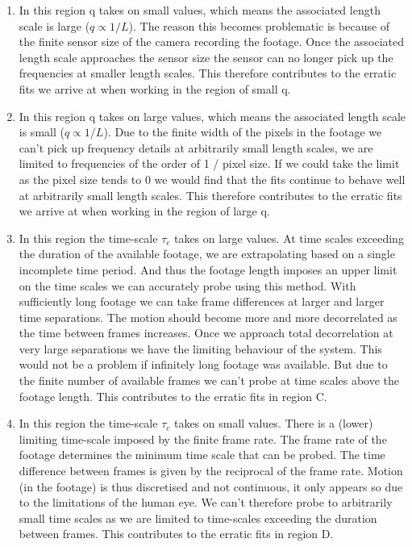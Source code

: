 \documentclass[11pt]{article}
\begin{document}
\begin{enumerate}[label=(\Alph*)]
\item In this region q takes on small values, which means the associated length scale is large ($q \propto 1 / L$). The reason this becomes problematic is because of the finite sensor size of the camera recording the footage. Once the associated length scale approaches the sensor size the sensor can no longer pick up the frequencies at smaller length scales. This therefore contributes to the erratic fits we arrive at when working in the region of small q.
     
\item In this region q takes on large values, which means the associated length scale is small ($q \propto 1 / L$). Due to the finite width of the pixels in the footage we can't pick up frequency details at arbitrarily small length scales, we are limited to frequencies of the order of 1 / pixel size. If we could take the limit as the pixel size tends to 0 we would find that the fits continue to behave well at arbitrarily small length scales. This therefore contributes to the erratic fits we arrive at when working in the region of large q.

\item In this region the time-scale $\tau_c$ takes on large values. At time scales exceeding the duration of the available footage, we are extrapolating based on a single incomplete time period. And thus the footage length imposes an upper limit on the time scales we can accurately probe using this method. With sufficiently long footage we can take frame differences at larger and larger time separations. The motion should become more and more decorrelated as the time between frames increases. Once we approach total decorrelation at very large separations we have the limiting behaviour of the system. This would not be a problem if infinitely long footage was available. But due to the finite number of available frames we can't probe at time scales above the footage length. This contributes to the erratic fits in region C.

\item In this region the time-scale $\tau_c$ takes on small values. There is a (lower) limiting time-scale imposed by the finite frame rate. The frame rate of the footage determines the minimum time scale that can be probed. The time difference between frames is given by the reciprocal of the frame rate. Motion (in the footage) is thus discretised and not continuous, it only appears so due to the limitations of the human eye. We can't therefore probe to arbitrarily small time scales as we are limited to time-scales exceeding the duration between frames. This contributes to the erratic fits in region D.


\end{enumerate}
\end{document}
